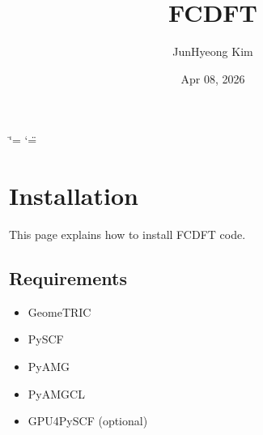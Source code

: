 \documentclass[letterpaper,10pt,english]{sphinxmanual}
\title{FC\sphinxhyphen{}DFT}
\date{Apr 08, 2026}
\author{Jun\sphinxhyphen{}Hyeong Kim}
\begin{document}
\ifdefined\shorthandoff
  \ifnum\catcode`\=\string=\active\shorthandoff{=}\fi
  \ifnum\catcode`\"=\active{}\fi
\fi

\pagestyle{empty}
\sphinxmaketitle
\pagestyle{plain}
\sphinxtableofcontents
\pagestyle{normal}
\label{\detokenize{index::doc}}


\sphinxstepscope


\chapter{Installation}
\label{\detokenize{install:installation}}\label{\detokenize{install::doc}}
\sphinxAtStartPar
This page explains how to install FC\sphinxhyphen{}DFT code.


\section{Requirements}
\label{\detokenize{install:requirements}}\begin{itemize}
\item {} 
\sphinxAtStartPar
GeomeTRIC

\item {} 
\sphinxAtStartPar
PySCF

\item {} 
\sphinxAtStartPar
PyAMG

\item {} 
\sphinxAtStartPar
PyAMGCL

\item {} 
\sphinxAtStartPar
GPU4PySCF (optional)

\end{itemize}
\end{document}
